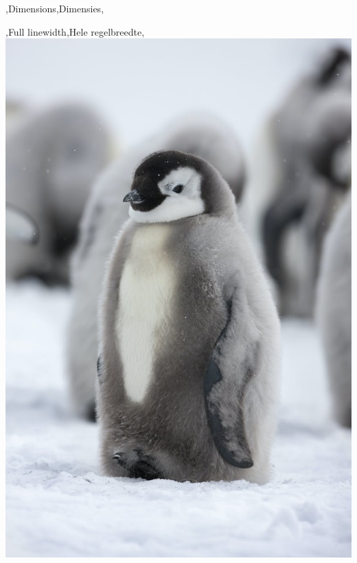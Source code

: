 \begin{frame}[fragile]{\lang,Dimensions,Dimensies,}
    \begin{noindentlist}\setlength{\itemsep}{20pt}
        \item \lang,Full linewidth,Hele regelbreedte,\\
        \texttt{\includegraphics[width=\linewidth]{assets/pinguin.jpg}}
        

\end{noindentlist}
\end{frame}
